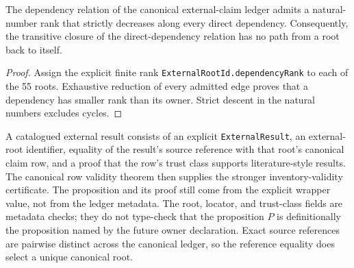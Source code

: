 \begin{theorem}
  \label{thm:external-claim-dependency-acyclic}
  \leanok
  The dependency relation of the canonical external-claim ledger admits a
  natural-number rank that strictly decreases along every direct dependency.
  Consequently, the transitive closure of the direct-dependency relation has
  no path from a root back to itself.
\end{theorem}

\begin{proof}
  Assign the explicit finite rank \texttt{ExternalRootId.dependencyRank} to
  each of the 55 roots.  Exhaustive reduction of every admitted edge proves
  that a dependency has smaller rank than its owner.  Strict descent in the
  natural numbers excludes cycles.
  \leanok
\end{proof}

\begin{definition}
  \label{def:catalogued-external-result}
  \leanok
  A catalogued external result consists of an explicit
  \texttt{ExternalResult}, an external-root identifier, equality of the
  result's source reference with that root's canonical claim row, and a proof
  that the row's trust class supports literature-style results.  The canonical
  row validity theorem then supplies the stronger inventory-validity
  certificate.  The proposition and its proof still come from the explicit
  wrapper value, not from the ledger metadata.
  The root, locator, and trust-class fields are metadata checks; they do not
  type-check that the proposition $P$ is definitionally the proposition named
  by the future owner declaration.  Exact source references are pairwise
  distinct across the canonical ledger, so the reference equality does select
  a unique canonical root.
\end{definition}

